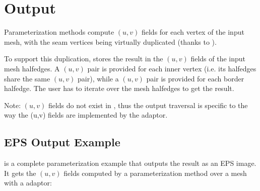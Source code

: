 \section{Output}

Parameterization methods compute $(u,v)$ fields for each vertex
of the input mesh, with the seam vertices being virtually duplicated (thanks
to ).

To support this duplication,
 stores
the result in the $(u,v)$ fields of the input mesh halfedges.
A $(u,v)$ pair is provided for
each inner vertex (i.e. its halfedges share the same $(u,v)$ pair),
while a $(u,v)$ pair is provided for each border halfedge.
The user has to iterate over the mesh halfedges to get the result.

Note: $(u,v)$ fields do not exist in ,
thus the output traversal is specific to the way the (u,v) fields are implemented by the adaptor.

\subsection{EPS Output Example}

 is a complete parameterization
example that outputs the result as an EPS image.
It gets the $(u,v)$ fields computed by a
parameterization method over a  mesh with a
 adaptor:


